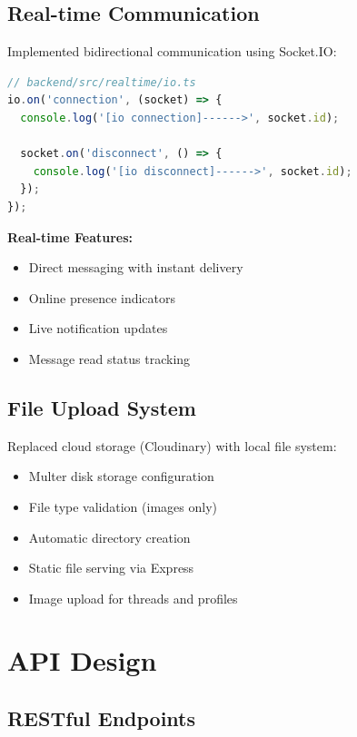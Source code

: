 \documentclass[11pt,a4paper]{article}
\begin{document}
\subsection{Real-time Communication}

Implemented bidirectional communication using Socket.IO:

\begin{lstlisting}[language=JavaScript, caption=Socket.IO Integration]
// backend/src/realtime/io.ts
io.on('connection', (socket) => {
  console.log('[io connection]------>', socket.id);
  
  socket.on('disconnect', () => {
    console.log('[io disconnect]------>', socket.id);
  });
});
\end{lstlisting}

\textbf{Real-time Features:}
\begin{itemize}[leftmargin=*]
    \item Direct messaging with instant delivery
    \item Online presence indicators
    \item Live notification updates
    \item Message read status tracking
\end{itemize}

\subsection{File Upload System}

Replaced cloud storage (Cloudinary) with local file system:

\begin{itemize}[leftmargin=*]
    \item Multer disk storage configuration
    \item File type validation (images only)
    \item Automatic directory creation
    \item Static file serving via Express
    \item Image upload for threads and profiles
\end{itemize}

\section{API Design}

\subsection{RESTful Endpoints}
\end{document}
